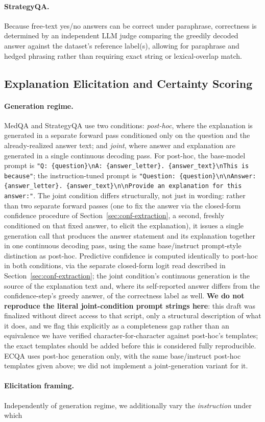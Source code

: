 \documentclass[letterpaper]{article} %
\begin{document}
\paragraph{StrategyQA.} Because free-text yes/no answers can be correct under paraphrase, correctness is determined by an independent LLM judge comparing the greedily decoded answer against the dataset's reference label(s), allowing for paraphrase and hedged phrasing rather than requiring exact string or lexical-overlap match. \subsection{Explanation Elicitation and Certainty Scoring} \label{sec:elicitation} \paragraph{Generation regime.} MedQA and StrategyQA use two conditions: \emph{post-hoc}, where the explanation is generated in a separate forward pass conditioned only on the question and the already-realized answer text; and \emph{joint}, where answer and explanation are generated in a single continuous decoding pass. For post-hoc, the base-model prompt is \texttt{"Q: \{question\}\textbackslash nA: \{answer\_letter\}. \{answer\_text\}\textbackslash nThis is because"}; the instruction-tuned prompt is \texttt{"Question: \{question\}\textbackslash n\textbackslash nAnswer: \{answer\_letter\}. \{answer\_text\}\textbackslash n\textbackslash nProvide an explanation for this answer:"}. The joint condition differs structurally, not just in wording: rather than two separate forward passes (one to fix the answer via the closed-form confidence procedure of Section~\ref{sec:conf-extraction}, a second, freshly conditioned on that fixed answer, to elicit the explanation), it issues a single generation call that produces the answer statement and its explanation together in one continuous decoding pass, using the same base/instruct prompt-style distinction as post-hoc. Predictive confidence is computed identically to post-hoc in both conditions, via the separate closed-form logit read described in Section~\ref{sec:conf-extraction}; the joint condition's continuous generation is the source of the explanation text and, where its self-reported answer differs from the confidence-step's greedy answer, of the correctness label as well. \textbf{We do not reproduce the literal joint-condition prompt strings here}: this draft was finalized without direct access to that script, only a structural description of what it does, and we flag this explicitly as a completeness gap rather than an equivalence we have verified character-for-character against post-hoc's templates; the exact templates should be added before this is considered fully reproducible. ECQA uses post-hoc generation only, with the same base/instruct post-hoc templates given above; we did not implement a joint-generation variant for it. \paragraph{Elicitation framing.} Independently of generation regime, we additionally vary the \emph{instruction} under which 
\end{document}
